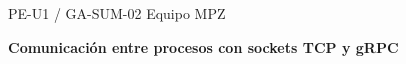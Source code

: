 \documentclass[11pt,a4paper]{article}
\begin{document}
\hypersetup{pageanchor=false}

\hypersetup{pageanchor=true}
{\small PE-U1 / GA-SUM-02 \hfill Equipo MPZ\par}
{\Large\bfseries Comunicación entre procesos con sockets TCP y gRPC\par}






\clearpage

\clearpage

\clearpage

\clearpage

\clearpage

\clearpage

\clearpage

\clearpage
\printbibliography[title={Referencias}]
\end{document}
